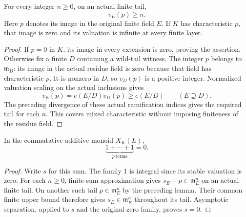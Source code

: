 \begin{lemma}
\label{fw:apf-prime-valuation-diverges}
\leanok
For every integer $n\geq0$, on an actual finite tail,
\[
 v_E(p)\geq n.
\]
Here $p$ denotes its image in the original finite field $E$.
If $K$ has characteristic $p$, that image is zero and its valuation
is infinite at every finite layer.
\end{lemma}
\begin{proof}
If $p=0$ in $K$, its image in every extension is zero, proving the
assertion. Otherwise fix a finite $D$ containing a wild-tail witness.
The integer $p$ belongs to $\mathfrak m_D$: its image in the actual
residue field is zero because that field has characteristic $p$.
It is nonzero in $D$, so $v_D(p)$ is a positive integer.
Normalized valuation scaling on the actual inclusions gives
\[
 v_E(p)=e(E/D)v_D(p)\geq e(E/D)\qquad(E\supseteq D).
\]
The preceding divergence of these actual ramification indices gives
the required tail for each $n$. This covers mixed characteristic
without imposing finiteness of the residue field.
\end{proof}

\begin{lemma}
\label{fw:norm-limit-prime-sum-zero}
\leanok
In the commutative additive monoid $X_K(L)$,
\[
 \underbrace{1+\cdots+1}_{p\ \mathrm{terms}}=0.
\]
\end{lemma}
\begin{proof}
Write $s$ for this sum. The family $1$ is integral since its stable
valuation is zero. For each $n\geq0$, finite-sum approximation gives
$s_E-p\in\mathfrak m_E^n$ on an actual finite tail.
On another such tail $p\in\mathfrak m_E^n$ by the preceding lemma.
Their common finite upper bound therefore gives
$s_E\in\mathfrak m_E^n$ throughout its tail.
Asymptotic separation, applied to $s$ and the original zero family,
proves $s=0$.
\end{proof}

